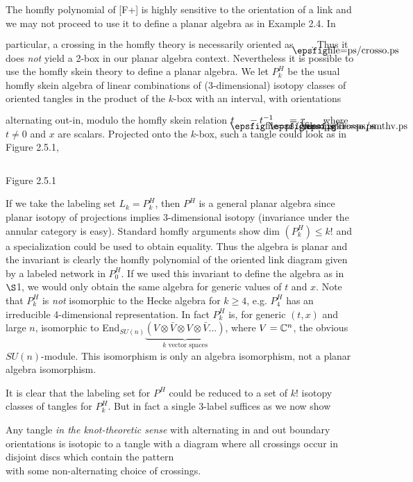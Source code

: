 The {\sc homfly} polynomial of [F+] is highly sensitive to the
orientation of a link and we may not proceed to use it to define a
planar algebra as in Example 2.4. In particular, a crossing in the
{\sc homfly} theory is necessarily oriented as $\crsso$.
Thus it does {\it not} yield a 2-box in our planar algebra context.
Nevertheless it is possible to use the {\sc homfly} skein theory to
define a planar algebra. We let $P^H_k$ be the usual {\sc homfly}
skein algebra of linear combinations of (3-dimensional) isotopy
classes of oriented tangles in the product of the $k$-box with an
interval, with orientations alternating out-in, modulo the
{\sc homfly} skein relation\newline
 $t\crsso -t^{-1}\crssor =x\smthv$ 
where $t\neq 0$ and $x$ are scalars. Projected onto the $k$-box,
such a tangle could look as in Figure 2.5.1,

\[
	
\]
\begin{center}
Figure 2.5.1
\end{center}

If we take the labeling set $L_k=P^H_k$, then $P^H$ is a general planar
algebra since planar isotopy of projections implies 3-dimensional
isotopy (invariance under the annular category is easy).
Standard {\sc homfly} arguments show dim $(P^H_k)\leq k!$
and a specialization could be used to obtain equality. Thus the
algebra is planar and the invariant is clearly the
{\sc homfly} polynomial of the
oriented link diagram given by a labeled network in $P^H_0$.
If we used this invariant to define the algebra as in $\S$1, we
would only obtain the same algebra for generic values of $t$ and
$x$. Note that $P^H_k$ is {\it not} isomorphic to the Hecke algebra
for $k\geq 4$, e.g. $P^H_4$ has an irreducible 4-dimensional
representation. In fact $P^H_k$ is, for generic $(t,x)$ and large
$n$, isomorphic to End${}_{SU(n)}
\underbrace{(V\otimes\bar V\otimes V\otimes \bar V\dots)}_{k\text{ \ vector\  spaces}}$,
where $V=\Bbb C^n$, the obvious $SU(n)$-module. This isomorphism is
only an algebra isomorphism, not a planar algebra isomorphism.

It is clear that the labeling set for $P^H$ could be reduced to a
set of $k!$ isotopy classes of tangles for $P^H_k$. But in fact a
single 3-label suffices as we now show

\bs
{} Any tangle {\it in the knot-theoretic sense}
with alternating in and out boundary orientations is
isotopic to a tangle with a diagram where all crossings occur in
disjoint discs which contain the pattern 
\[
	
\]
with some non-alternating choice of crossings.

